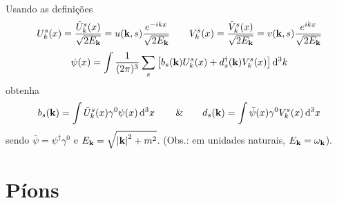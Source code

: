 \documentclass[a4paper, 11pt, oneside]{impression}
\begin{document}
\begin{exercise}{}
    Usando as definições
        \begin{equation*}
            U_{k}^{s}(x) = \dfrac{\tilde{U}_{k}^{s}(x)}{\sqrt{2E_{\vb{k}}}} = u(\vb{k},s)\dfrac{e^{-ikx}}{\sqrt{2E_{\vb{k}}}} \qquad 
            V_{k}^{s}(x) = \dfrac{\tilde{V}_{k}^{s}(x)}{\sqrt{2E_{\vb{k}}}} = v(\vb{k},s)\dfrac{e^{ikx}}{\sqrt{2E_{\vb{k}}}}
        \end{equation*}
        \begin{equation*}
            \psi(x) = \int \dfrac{1}{(2\pi)^3}\sum_{s}\qty[
                b_{s}(\vb{k}) U_{k}^{s}(x) +
                d_{s}^{\dagger}(\vb{k}) V_{k}^{s}(x)
            ] \dd[3]{k}
        \end{equation*}
    obtenha
        \begin{equation*}
            b_{s}(\vb{k}) = \int \bar{U}_{k}^{s}(x) \gamma^{0} \psi(x) \dd[3]{x} 
            \qquad \& \qquad 
            d_{s}(\vb{k}) = \int \bar{\psi}(x) \gamma^{0} V_{k}^{s}(x) \dd[3]{x}
        \end{equation*}
    sendo $\bar{\psi} = \psi^{\dagger}\gamma^{0}$ e $E_{\vb{k}} = \sqrt{\abs{\vb{k}}^2 + m^2}$. (Obs.: em unidades naturais, $E_{\vb{k}} = \omega_{\vb{k}}$).
\end{exercise}



\newpage

\chapter{Píons}\label{quest: seven}
\end{document}
